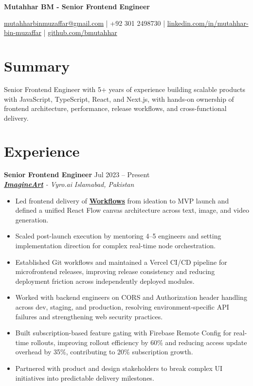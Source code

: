 \documentclass[9pt,letterpaper]{article}
\newcommand{\resumeHeader}[1]{%
  \begin{center}
    \vspace{2pt}
    {\fontsize{18pt}{20pt}\selectfont\bfseries #1\par}
    \vspace{4pt}
  \end{center}
}
\newcommand{\role}[4]{\textbf{#1} \hfill #2 \\
\textit{#3} \hfill \textit{#4}\\[-4pt]}
\begin{document}
\resumeHeader{Mutahhar BM - Senior Frontend Engineer}
\begin{center}
\fontsize{9pt}{11pt}\selectfont
\href{mailto:mutahharbinmuzaffar@gmail.com}{mutahharbinmuzaffar@gmail.com} \;|\; +92 301 2498730 \;|\;
\href{https://www.linkedin.com/in/mutahhar-bin-muzaffar}{linkedin.com/in/mutahhar-bin-muzaffar} \;|\;
\href{https://github.com/bmutahhar}{github.com/bmutahhar}
\end{center}

\section*{Summary}
Senior Frontend Engineer with 5+ years of experience building scalable products with JavaScript, TypeScript, React, and Next.js, with hands-on ownership of frontend architecture, performance, release workflows, and cross-functional delivery.

\section*{Experience}
\role{Senior Frontend Engineer}{Jul 2023 -- Present}{\href{https://www.imagine.art/}{\textbf{\underline{ImagineArt}}} - Vyro.ai}{Islamabad, Pakistan}
\begin{itemize}[leftmargin=*, itemsep=0pt, topsep=0pt, partopsep=0pt, parsep=0pt, after=\vspace{2pt}]
  \item Led frontend delivery of \href{https://www.imagine.art/flow}{\textbf{\underline{Workflows}}} from ideation to MVP launch and defined a unified React Flow canvas architecture across text, image, and video generation.
  \item Scaled post-launch execution by mentoring 4--5 engineers and setting implementation direction for complex real-time node orchestration.
  \item Established Git workflows and maintained a Vercel CI/CD pipeline for microfrontend releases, improving release consistency and reducing deployment friction across independently deployed modules.
  \item Worked with backend engineers on CORS and Authorization header handling across dev, staging, and production, resolving environment-specific API failures and strengthening web security practices.
  \item Built subscription-based feature gating with Firebase Remote Config for real-time rollouts, improving rollout efficiency by 60\% and reducing access update overhead by 35\%, contributing to 20\% subscription growth.
  \item Partnered with product and design stakeholders to break complex UI initiatives into predictable delivery milestones.

\end{itemize}
\end{document}
